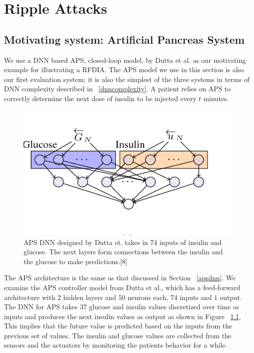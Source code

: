 \chapter{Ripple Attacks}
\label{attack}

\section{Motivating system: Artificial Pancreas System}
\label{aps}

We use a DNN based \ac{APS}, closed-loop model, by Dutta et al. \cite{10.1007/978-3-319-99429-1_11}  as our motivating example for illustrating a \ac{RFDIA}. 
The \ac{APS} model we use in this section is also our first evaluation system; it is also the simplest of the three systems in terms of \ac{DNN} complexity described in ~\ref{dnncomplexity}.
A patient relies on  \ac{APS} to correctly determine the next dose of insulin to be injected every $t$ minutes. 

\begin{figure}
	\centering
	\includegraphics[width=0.7\linewidth, height=0.3\linewidth]{Images/APSDNN}
	\caption[APS DNN]{APS DNN designed by Dutta et. takes in 74 inputs of insulin and glucose. The next layers form connections between the insulin and the glucose to make predictions.[8]}
	\label{fig:apsdnn}
\end{figure}

The APS architecture is  the same as that discussed in Section ~\ref{apsdnn}. 
We examine the \ac{APS} controller model from Dutta et al., which has a feed-forward architecture with $2$ hidden layers and $50$ neurons each, 74 inputs and $1$ output. 
The DNN for APS takes $37$ glucose and insulin values discretized over time as inputs and produces the next insulin values as output as shown in Figure ~\ref{fig:apsdnn}. 
 This implies that the future value is predicted based on the inputs from the previous set of values. 
The insulin and glucose values are collected from the sensors and the actuators by monitoring the patients behavior for a while. 



